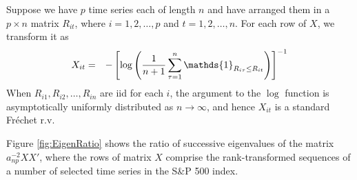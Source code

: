 \documentclass[11pt,reqno]{amsart}
\newcommand{\1}{\mathds{1}}
\newcommand{\0}{\boldsymbol{0}}
\newcommand{\4}{\mathchoice{\mskip1.5mu}{\mskip1.5mu}{}{}}
\newcommand{\5}{\mathchoice{\mskip-1.5mu}{\mskip-1.5mu}{}{}}
\newcommand{\2}{\penalty250\mskip\thickmuskip\mskip-\thinmuskip} %
\begin{document}
Suppose we have $p$ time series each of length $n$ and have arranged
them in a $p\times n$ matrix $R_{it}$, where $i = 1, 2, \dots, p$ and
$t=1,2, \dots, n$. For each row of $X$, we transform it as
\begin{eqnarray*}
  X_{it} &=& -\left[
    \log \left({1 \over n+1} \sum_{\tau=1}^n \1_{R_{i\tau} \leq R_{it}} \right)
  \right]^{-1}
\end{eqnarray*}
When $R_{i1}, R_{i2}, \dots, R_{in}$ are iid for each $i$, the
argument to the $\log$ function is asymptotically uniformly
distributed as $n \to \infty$, and hence $X_{it}$ is a standard
Fr\'echet r.v.

Figure \ref{fig:EigenRatio} shows the ratio of successive eigenvalues
of the matrix $a_{np}^{-2}XX'$, where the rows of matrix $X$ comprise
the rank-transformed sequences of a number of selected time series
in the S\&P 500 index.
\end{document}
